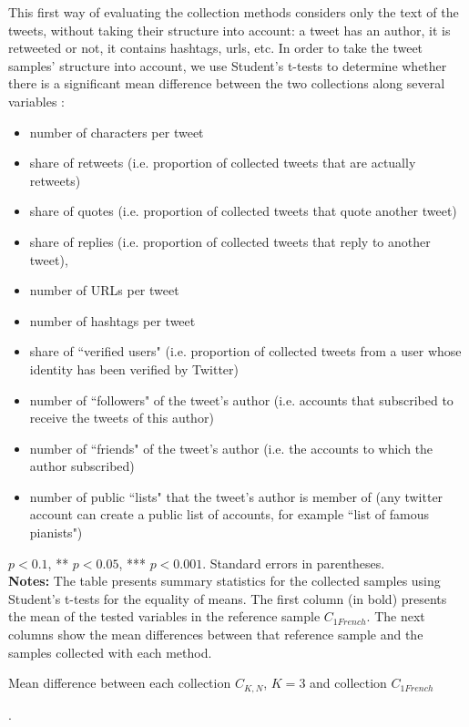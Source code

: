 This first way of evaluating the collection methods considers only the text of the tweets, without taking their structure into account: a tweet has an author, it is retweeted or not, it contains hashtags, urls, etc. In order to take the tweet samples' structure into account, we use  Student's t-tests to determine whether there is a significant mean difference between the two collections along several variables : 
\begin{itemize}
\item number of characters per tweet
\item share of retweets (i.e. proportion of collected tweets that are actually retweets)
\item share of quotes (i.e. proportion of collected tweets that quote another tweet)
\item share of replies (i.e. proportion of collected tweets that reply to another tweet), 
\item number of URLs per tweet
\item number of hashtags per tweet
\item share of ``verified users" (i.e. proportion of collected tweets from a user whose identity has been verified by Twitter)
\item number of ``followers" of the tweet's author (i.e. accounts that subscribed to receive the tweets of this author)
\item number of ``friends" of the tweet's author (i.e. the accounts to which the author subscribed)
\item number of public ``lists" that the tweet's author is member of (any twitter account can create a public list of accounts, for example ``list of famous pianists")
\end{itemize}

\begin{table}
\begin{center}
\makebox[\textwidth][c]{}
\end{center} 
	\scriptsize * $p < 0.1$, ** $p < 0.05$, *** $p < 0.001$. Standard errors in parentheses.\\
	\scriptsize \textbf{Notes:} The table presents summary statistics for the collected samples using Student's t-tests for the equality of means. The first column (in bold) presents the mean of the tested variables in the reference sample $C_{1French}$. The next columns show the mean differences between that reference sample and the samples collected with each method.
	\caption{Mean difference between each collection $C_{K,N}$, $K = 3$ and collection $C_{1French}$ }. 
	\label{Tab:ttest_sample_c3200}
\end{table}

